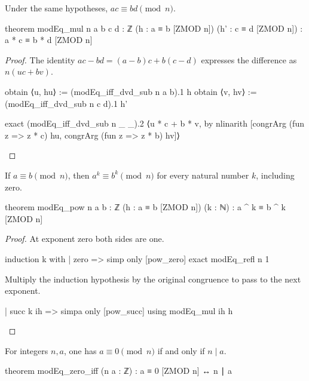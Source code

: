 \begin{theorem}
  \label{ent:thm:modeq-mul}
  Under the same hypotheses, $ac\equiv bd\pmod n$.

  \begin{lean}
    theorem modEq_mul {n a b c d : ℤ} (h : a ≡ b [ZMOD n]) (h' : c ≡ d [ZMOD n]) :
        a * c ≡ b * d [ZMOD n]
  \end{lean}
\end{theorem}

\begin{proof}
  The identity $ac-bd=(a-b)c+b(c-d)$ expresses the difference as $n(uc+bv)$.

  \begin{lean}
    obtain ⟨u, hu⟩ := (modEq_iff_dvd_sub n a b).1 h
    obtain ⟨v, hv⟩ := (modEq_iff_dvd_sub n c d).1 h'

    exact (modEq_iff_dvd_sub n _ _).2 ⟨u * c + b * v, by
      nlinarith [congrArg (fun z => z * c) hu, congrArg (fun z => z * b) hv]⟩
  \end{lean}
\end{proof}

\begin{theorem}
  \label{ent:thm:modeq-pow}
  If $a\equiv b\pmod n$, then $a^k\equiv b^k\pmod n$ for every natural number $k$, including zero.

  \begin{lean}
    theorem modEq_pow {n a b : ℤ} (h : a ≡ b [ZMOD n]) (k : ℕ) :
        a ^ k ≡ b ^ k [ZMOD n]
  \end{lean}
\end{theorem}

\begin{proof}
  At exponent zero both sides are one.

  \begin{lean}
    induction k with
    | zero =>
      simp only [pow_zero]
      exact modEq_refl n 1
  \end{lean}

  Multiply the induction hypothesis by the original congruence to pass to the next exponent.

  \begin{lean}
    | succ k ih => simpa only [pow_succ] using modEq_mul ih h
  \end{lean}
\end{proof}

\begin{theorem}
  \label{ent:thm:modeq-zero-iff}
  For integers $n,a$, one has $a\equiv0\pmod n$ if and only if $n\mid a$.

  \begin{lean}
    theorem modEq_zero_iff (n a : ℤ) : a ≡ 0 [ZMOD n] ↔ n ∣ a
  \end{lean}
\end{theorem}

